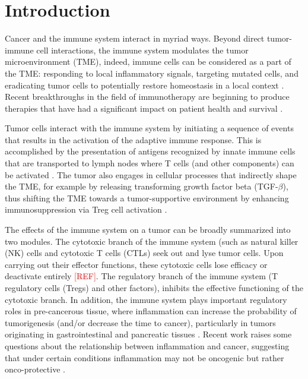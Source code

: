 \documentclass[11pt]{article}
\newcommand{\tcr} { \textcolor{red} }
\begin{document}


\section{Introduction}
Cancer and the immune system interact in myriad ways. Beyond direct tumor-immune cell interactions, the immune system modulates the tumor microenvironment (TME), indeed, immune cells can be considered as a part of the TME: responding to local inflammatory signals, targeting mutated cells, and eradicating tumor cells to potentially restore homeostasis in a local context \cite{de2006paradoxical}. Recent breakthroughs in the field of immunotherapy are beginning to produce therapies that have had a significant impact on patient health and survival \cite{pardoll2012blockade,restifo2012adoptive}.
\par 
Tumor cells interact with the immune system by initiating a sequence of events that results in the activation of the adaptive immune response. This is accomplished by the presentation of antigens recognized by innate immune cells that are transported to lymph nodes where T cells (and other components) can be activated \cite{schreiber11_cancer}. The tumor also engages in cellular processes that indirectly shape the TME, for example by releasing transforming growth factor beta (TGF-$\beta$), thus shifting the TME towards a tumor-supportive environment by enhancing immunosuppression via Treg cell activation \cite{schreiber11_cancer}.
\par
The effects of the immune system on a tumor can be broadly summarized into two modules. The cytotoxic branch of the immune system (such as natural killer (NK) cells and cytotoxic T cells (CTLs) seek out and lyse tumor cells.
Upon carrying out their effector functions, these cytotoxic cells lose efficacy or deactivate entirely\tcr{[REF]}.
The regulatory branch of the immune system (T regulatory cells (Tregs) and other factors), inhibits the effective functioning of the cytotoxic branch\cite{ruffell2010lymphocytes}.
In addition, the immune system plays important regulatory roles in pre-cancerous tissue, where inflammation can increase the probability of tumorigenesis (and/or decrease the time to cancer), particularly in tumors originating in gastrointestinal and pancreatic tissues \cite{hu10_inflammationinduced, balkwill01_inflammation}. Recent work raises some questions about the relationship between inflammation and cancer, suggesting that under certain conditions inflammation may not be oncogenic but rather onco-protective \cite{guo2017multiscale}. 
\end{document}
